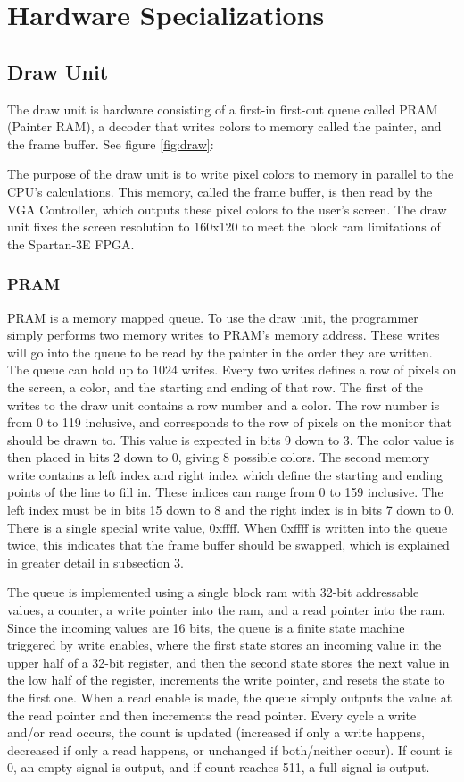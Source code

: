 \documentclass[onecolumn]{IEEEtran}
\begin{document}
\section{Hardware Specializations}
\subsection{Draw Unit}
The draw unit is hardware consisting of a first-in first-out queue called PRAM (Painter RAM), a decoder that writes colors to memory called the painter, and the frame buffer.  See figure \ref{fig:draw}:


The purpose of the draw unit is to write pixel colors to memory in parallel to the CPU’s calculations.  This memory, called the frame buffer, is then read by the VGA Controller, which outputs these pixel colors to the user’s screen.  The draw unit fixes the screen resolution to 160x120 to meet the block ram limitations of the Spartan-3E FPGA.

\subsubsection{PRAM}
PRAM is a memory mapped queue.  To use the draw unit, the programmer simply performs two memory writes to PRAM’s memory address.  These writes will go into the queue to be read by the painter in the order they are written.  The queue can hold up to 1024 writes.  Every two writes defines a row of pixels on the screen, a color, and the starting and ending of that row.  The first of the writes to the draw unit contains a row number and a color.  The row number is from 0 to 119 inclusive, and corresponds to the row of pixels on the monitor that should be drawn to.  This value is expected in bits 9 down to 3.  The color value is then placed in bits 2 down to 0, giving 8 possible colors.  The second memory write contains a left index and right index which define the starting and ending points of the line to fill in.  These indices can range from 0 to 159 inclusive.  The left index must be in bits 15 down to 8 and the right index is in bits 7 down to 0.  There is a single special write value, 0xffff.  When 0xffff is written into the queue twice, this indicates that the frame buffer should be swapped, which is explained in greater detail in subsection 3.

The queue is implemented using a single block ram with 32-bit addressable values, a counter, a write pointer into the ram, and a read pointer into the ram.  Since the incoming values are 16 bits, the queue is a finite state machine triggered by write enables, where the first state stores an incoming value in the upper half of a 32-bit register, and then the second state stores the next value in the low half of the register, increments the write pointer, and resets the state to the first one.  When a read enable is made, the queue simply outputs the value at the read pointer and then increments the read pointer.  Every cycle a write and/or read occurs, the count is updated (increased if only a write happens, decreased if only a read happens, or unchanged if both/neither occur).  If count is 0, an empty signal is output, and if count reaches 511, a full signal is output.
\end{document}
